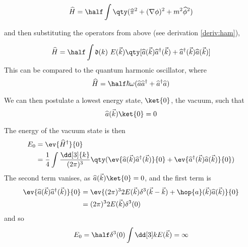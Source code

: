 \begin{equation}
  \label{eq:24}
  \Op{H} = \half \int \qty( \Op{\pi}^2 +(\nabla \phi)^2+m^2 \Op{\phi}^2)
\end{equation}

and then substituting the operators from above (see derivation \ref{deriv:ham}),

\begin{equation}
  \label{eq:27}
  \Op{H} = \half \int \nm{k} E(\vec{k}) \qty[ \Op{a}(\vec{k}) \hOp{a}(\vec{k}) + \hOp{a}(\vec{k}) \Op{a}(\vec{k})]
\end{equation}
This can be compared to the quantum harmonic oscillator, where
\begin{equation}
  \label{eq:31}
  \Op{H} = \half \hbar \omega ( \Op{a} \hOp{a} + \hOp{a} \Op{a})
\end{equation}

We can then postulate a lowest energy state, $\ket{0}$, the vacuum, such that
\begin{equation}
  \label{eq:34}
  \Op{a}(\vec{k}) \ket{0} = 0
\end{equation}

\providecommand\normmeasure[1]{ \frac{\dd[3]{#1}}{(2 \pi)^3 2 E(\vec{#1})}}

The energy of the vacuum state is then
\begin{align*}
 E_0 &= \ev{\hOp{H}}{0} \\ &= \frac{1}{4} \int \frac{\dd[3]{k}}{(2 \pi)^3} \qty( \ev{\Op{a}(\vec{k}) \hOp{a}(\vec{k})}{0} + \ev{\hOp{a}(\vec{k}) \Op{a}(\vec{k})}{0}) 
\end{align*}
The second term vanises, as $\Op{a}(\vec{k}) \ket{0} = 0$, and the first term is
\begin{align*}
 \ev{\Op{a}(\vec{k}) \hOp{a}(\vec{k})}{0} &=  \ev{(2 \pi)^3 2 E(\vec{k}) \delta^3(\vec{k}-\vec{k}) + \hop{a}(\vec{k})\Op{a}(\vec{k})}{0}\\
&= (2 \pi)^3 2 E(\vec{k}) \delta^3(0)
\end{align*}
and so
\[ E_0 = \half \delta^3(0) \int \dd[3] k E(\vec{k}) = \infty \]


